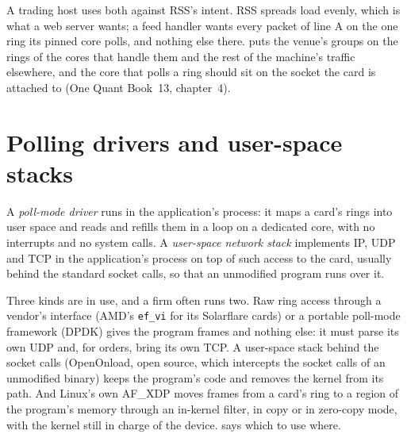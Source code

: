 A trading host uses both against RSS's intent. RSS spreads load evenly, which is what a web server wants; a feed handler wants every
packet of line A on the one ring its pinned core polls, and nothing else there.  puts the venue's groups on the rings of
the cores that handle them and the rest of the machine's traffic elsewhere, and the core that polls a ring should sit on the socket
the card is attached to (One Quant Book~13, chapter~4).

\section{Polling drivers and user-space stacks}

\begin{definition}\label{def:nw:network-cards-and-kernel-bypass:pmd}
A \emph{poll-mode driver} runs in the application's process: it maps a card's rings into user space and
reads and refills them in a loop on a dedicated core, with no interrupts and no system calls. A \emph{user-space network
stack} implements IP, UDP and TCP in the application's process on top of such access to the card,
usually behind the standard socket calls, so that an unmodified program runs over it.
\end{definition}

\begin{remark}\label{rem:nw:network-cards-and-kernel-bypass:families}
Three kinds are in use, and a firm often runs two. Raw ring access through a vendor's interface (AMD's \texttt{ef\_vi} for its
Solarflare cards) or a portable poll-mode framework (DPDK) gives the program frames and nothing else: it must parse its own UDP and,
for orders, bring its own TCP. A user-space stack behind the socket calls (OpenOnload, open source, which intercepts the socket calls
of an unmodified binary) keeps the program's code and removes the kernel from its path. And Linux's own AF\_XDP moves frames from a
card's ring to a region of the program's memory through an in-kernel filter, in copy or in zero-copy mode, with the kernel still in
charge of the device.  says which to use where.
\end{remark}

